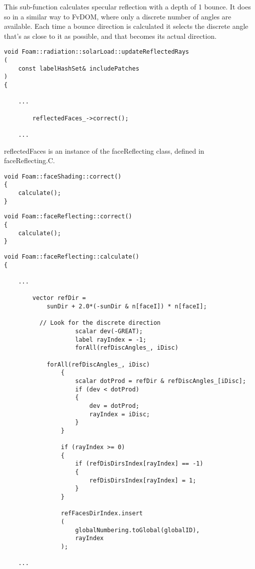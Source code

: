 This sub-function calculates specular reflection with a depth of 1 bounce. It does so in a similar way to FvDOM, where only a discrete number of angles are available. Each time a bounce direction is calculated it selects the discrete angle that's as close to it as possible, and that becomes its actual direction.

\begin{verbatim}
void Foam::radiation::solarLoad::updateReflectedRays
(
    const labelHashSet& includePatches
)
{

    ...

        reflectedFaces_->correct();
        
    ...
\end{verbatim}

reflectedFaces is an instance of the faceReflecting class, defined in faceReflecting.C.

\begin{verbatim}
void Foam::faceShading::correct()
{
    calculate();
}
\end{verbatim}

\begin{verbatim}
void Foam::faceReflecting::correct()
{
    calculate();
}
\end{verbatim}

\begin{verbatim}
void Foam::faceReflecting::calculate()
{

    ...

        vector refDir =
            sunDir + 2.0*(-sunDir & n[faceI]) * n[faceI];

          // Look for the discrete direction
                    scalar dev(-GREAT);
                    label rayIndex = -1;
                    forAll(refDiscAngles_, iDisc)
    
            forAll(refDiscAngles_, iDisc)
                {
                    scalar dotProd = refDir & refDiscAngles_[iDisc];
                    if (dev < dotProd)
                    {
                        dev = dotProd;
                        rayIndex = iDisc;
                    }
                }
    
                if (rayIndex >= 0)
                {
                    if (refDisDirsIndex[rayIndex] == -1)
                    {
                        refDisDirsIndex[rayIndex] = 1;
                    }
                }
    
                refFacesDirIndex.insert
                (
                    globalNumbering.toGlobal(globalID),
                    rayIndex
                );
                        
    ...
    
\end{verbatim}

